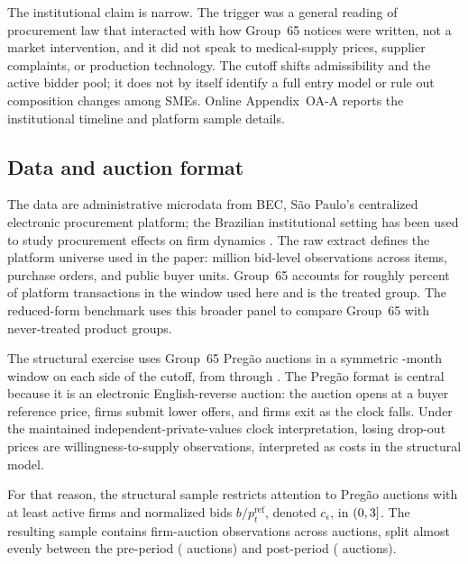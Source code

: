 The institutional claim is narrow. The trigger was a general reading of
procurement law that interacted with how Group~65 notices were written,
not a market intervention, and it did not speak to medical-supply prices,
supplier complaints, or production technology. The cutoff shifts
admissibility and the active bidder pool; it does not by itself identify a
full entry model or rule out composition changes among SMEs. Online
Appendix~OA-A reports the institutional timeline and platform sample
details.

\subsection{Data and auction format}

The data are administrative microdata from BEC, S\~ao Paulo's
centralized electronic procurement platform; the Brazilian institutional
setting has been used to study procurement effects on firm dynamics
\citep{ferraz2016}. The raw extract
defines the platform universe used in the paper: \nBidsRaw{} million
bid-level observations across \nItemsRaw{} items, \nPurchaseOrders{}
purchase orders, and \nPbu{} public buyer units. Group~65 accounts for roughly \groupSixtyfivePctTx{}
percent of platform transactions in the window used here and is the
treated group. The reduced-form benchmark uses this broader panel to
compare Group~65 with \controlGroupCount{} never-treated product groups.

The structural exercise uses Group~65 Preg\~ao auctions in a symmetric
\structuralWindowM-month window on each side of the \policyCutoffMonth{}
cutoff, from \windowStart{} through \windowEnd{}. The Preg\~ao format is
central because it is an electronic English-reverse auction: the auction
opens at a buyer reference price, firms submit lower offers, and firms
exit as the clock falls. Under the maintained independent-private-values
clock interpretation, losing drop-out prices are willingness-to-supply
observations, interpreted as costs in the structural model.

For that reason, the structural sample restricts attention to Preg\~ao
auctions with at least \filterMinBidders{} active firms and normalized
bids $b/p_t^{\mathrm{ref}}$, denoted $c_\epsilon$, in
$(0,3]$. The resulting sample contains \nObsAuctions{}
firm-auction observations across \nDistinctAuctions{} auctions, split
almost evenly between the pre-period (\nPreAuctions{} auctions) and
post-period (\nPostAuctions{} auctions).


